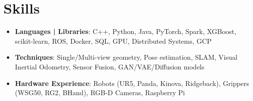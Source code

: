 \documentclass[letterpaper,10pt,hidelinks]{article}
\newcommand{\resumeSubHeadingListStart}{\begin{itemize}[leftmargin=*]}
\newcommand{\resumeSubHeadingListEnd}{\end{itemize}}
\newcommand{\shorterSection}[1]{\vspace{-10pt}\section{#1}}
\begin{document}
    \vspace{2pt}
    \shorterSection{Skills}
    \resumeSubHeadingListStart
    \small
    \item{
        \textbf{Languages | Libraries}{: C++, Python, Java, PyTorch, Spark, XGBoost, scikit-learn, ROS, Docker, SQL, GPU, Distributed Systems, GCP}
    }
    \vspace{-5pt}
    \small
    \item{
         \textbf{Techniques}: Single/Multi-view geometry, Pose estimation, SLAM, Visual Inertial Odometry, Sensor Fusion, GAN/VAE/Diffusion models 
    }
    \vspace{-5pt}
    \item{
        \textbf{Hardware Experience}{: Robots (UR5, Panda, Kinova, Ridgeback), Grippers (WSG50, RG2, BHand), RGB-D Cameras, Raspberry Pi}
    }
    \resumeSubHeadingListEnd
    
\end{document}
